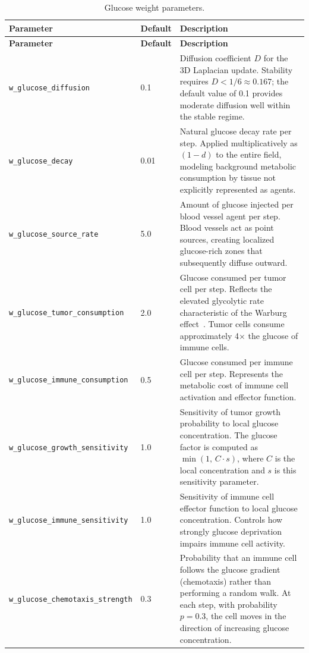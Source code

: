 \begin{longtable}{@{}llp{7cm}@{}}
\caption{Glucose weight parameters.} \label{tab:glucose-params} \\
\toprule
\textbf{Parameter} & \textbf{Default} & \textbf{Description} \\
\midrule
\endfirsthead
\toprule
\textbf{Parameter} & \textbf{Default} & \textbf{Description} \\
\midrule
\endhead
\texttt{w\_glucose\_diffusion} & 0.1 & Diffusion coefficient $D$ for the 3D Laplacian update. Stability requires $D < 1/6 \approx 0.167$; the default value of 0.1 provides moderate diffusion well within the stable regime. \\[4pt]

\texttt{w\_glucose\_decay} & 0.01 & Natural glucose decay rate per step. Applied multiplicatively as $(1 - d)$ to the entire field, modeling background metabolic consumption by tissue not explicitly represented as agents. \\[4pt]

\texttt{w\_glucose\_source\_rate} & 5.0 & Amount of glucose injected per blood vessel agent per step. Blood vessels act as point sources, creating localized glucose-rich zones that subsequently diffuse outward. \\[4pt]

\texttt{w\_glucose\_tumor\_consumption} & 2.0 & Glucose consumed per tumor cell per step. Reflects the elevated glycolytic rate characteristic of the Warburg effect~\cite{warburg1956}. Tumor cells consume approximately 4$\times$ the glucose of immune cells. \\[4pt]

\texttt{w\_glucose\_immune\_consumption} & 0.5 & Glucose consumed per immune cell per step. Represents the metabolic cost of immune cell activation and effector function. \\[4pt]

\texttt{w\_glucose\_growth\_sensitivity} & 1.0 & Sensitivity of tumor growth probability to local glucose concentration. The glucose factor is computed as $\min(1, \, C \cdot s)$, where $C$ is the local concentration and $s$ is this sensitivity parameter. \\[4pt]

\texttt{w\_glucose\_immune\_sensitivity} & 1.0 & Sensitivity of immune cell effector function to local glucose concentration. Controls how strongly glucose deprivation impairs immune cell activity. \\[4pt]

\texttt{w\_glucose\_chemotaxis\_strength} & 0.3 & Probability that an immune cell follows the glucose gradient (chemotaxis) rather than performing a random walk. At each step, with probability $p = 0.3$, the cell moves in the direction of increasing glucose concentration. \\
\bottomrule
\end{longtable}

